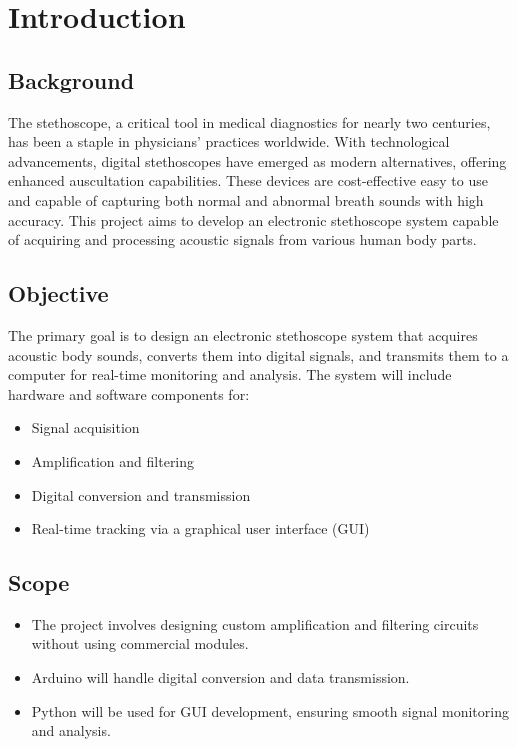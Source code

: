 \chapter{Introduction}

\section{Background}
The stethoscope, a critical tool in medical diagnostics for nearly two centuries, has been a staple in physicians’ practices worldwide. With technological advancements, digital stethoscopes have emerged as modern alternatives, offering enhanced auscultation capabilities. These devices are cost-effective easy to use and capable of capturing both normal and abnormal breath sounds with high accuracy. This project aims to develop an electronic stethoscope system capable of acquiring and processing acoustic signals from various human body parts.

\section{Objective}
The primary goal is to design an electronic stethoscope system that acquires acoustic body sounds, converts them into digital signals, and transmits them to a computer for real-time monitoring and analysis. The system will include hardware and software components for:

\begin{itemize}
	\item Signal acquisition
	\item Amplification and filtering
	\item Digital conversion and transmission
	\item Real-time tracking via a graphical user interface (GUI)
\end{itemize}

\section{Scope}

\begin{itemize}
	\item The project involves designing custom amplification and filtering circuits without using commercial modules.
	\item Arduino will handle digital conversion and data transmission.
	\item Python will be used for GUI development, ensuring smooth signal monitoring and analysis.
\end{itemize}
